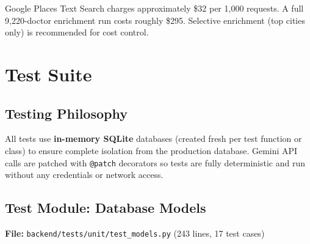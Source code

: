 \documentclass[12pt, a4paper]{article}
\newcommand{\file}[1]{\texttt{\color{accent}#1}}
\begin{document}
\begin{warningbox}[title={Cost Estimate}]
  Google Places Text Search charges approximately \$32 per 1,000 requests.
  A full 9,220-doctor enrichment run costs roughly \$295.
  Selective enrichment (top cities only) is recommended for cost control.
\end{warningbox}

\section{Test Suite}

\subsection{Testing Philosophy}

All tests use \textbf{in-memory SQLite} databases (created fresh per test
function or class) to ensure complete isolation from the production database.
Gemini API calls are patched with \texttt{@patch} decorators so tests are
fully deterministic and run without any credentials or network access.

\subsection{Test Module: Database Models}

\textbf{File:} \file{backend/tests/unit/test\_models.py} \quad
(243 lines, 17 test cases)
\end{document}
